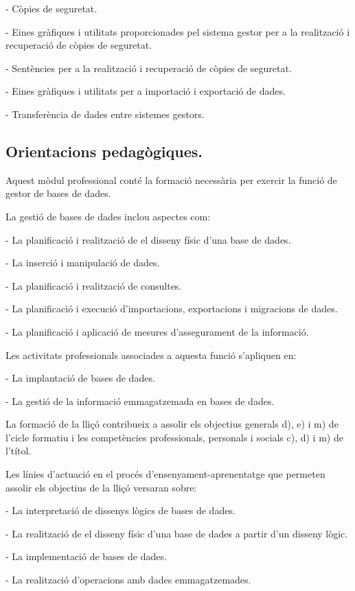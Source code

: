 \documentclass[catalan, a4paper, 12pt, titlepage]{article}
\begin{document}
- Còpies de seguretat.

- Eines gràfiques i utilitats proporcionades pel sistema gestor per a la realització i recuperació de còpies de seguretat.

- Sentències per a la realització i recuperació de còpies de seguretat.

- Eines gràfiques i utilitats per a importació i exportació de dades.

- Transferència de dades entre sistemes gestors.

\subsection{Orientacions pedagògiques.}

Aquest mòdul professional conté la formació necessària per exercir la funció de gestor de bases de dades.

La gestió de bases de dades inclou aspectes com:

- La planificació i realització de el disseny físic d'una base de dades.

- La inserció i manipulació de dades.

- La planificació i realització de consultes.

- La planificació i execució d'importacions, exportacions i migracions de dades.

- La planificació i aplicació de mesures d'assegurament de la informació.

Les activitats professionals associades a aquesta funció s'apliquen en:

- La implantació de bases de dades.

- La gestió de la informació emmagatzemada en bases de dades.

La formació de la lliçó contribueix a assolir els objectius generals d), e) i m) de l'cicle formatiu i les competències professionals, personals i socials c), d) i m) de l'títol.

Les línies d'actuació en el procés d'ensenyament-aprenentatge que permeten assolir els objectius de la lliçó versaran sobre:

- La interpretació de dissenys lògics de bases de dades.

- La realització de el disseny físic d'una base de dades a partir d'un disseny lògic.

- La implementació de bases de dades.

- La realització d'operacions amb dades emmagatzemades.
\end{document}
